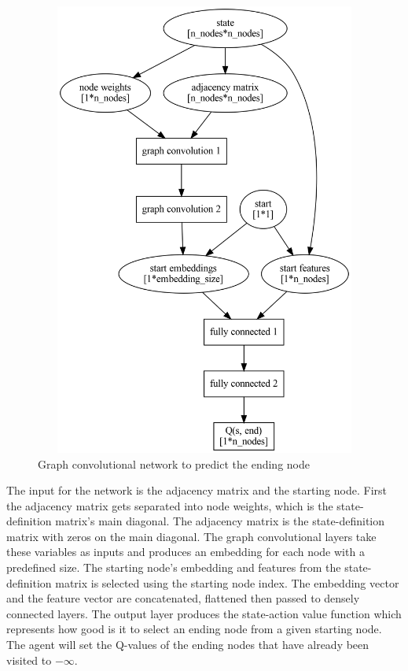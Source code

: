 \documentclass[
]{elteikthesis}[2023/04/10]
\begin{document}
\begin{figure}[H]
\begin{centering}
\includegraphics[width=25cm,height=15cm,keepaspectratio]{images/gcnn_end}
\par\end{centering}
\caption{Graph convolutional network to predict the ending node}

\end{figure}

The input for the network is the adjacency matrix and the starting
node. First the adjacency matrix gets separated into node weights,
which is the state-definition matrix's main diagonal. The adjacency
matrix is the state-definition matrix with zeros on the main diagonal.
The graph convolutional layers take these variables as inputs and
produces an embedding for each node with a predefined size. The starting
node's embedding and features from the state-definition matrix is
selected using the starting node index. The embedding vector and the
feature vector are concatenated, flattened then passed to densely
connected layers. The output layer produces the state-action value
function which represents how good is it to select an ending node
from a given starting node. The agent will set the Q-values of the
ending nodes that have already been visited to $-\infty$.
\end{document}
